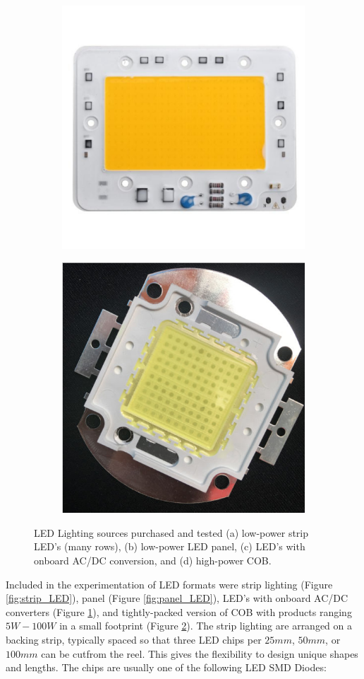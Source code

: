 \documentclass[fleqn,twoside]{article}
\begin{document}
\begin{figure}[h]
	\begin{subfigure}{.5\textwidth}
		\centering
		\includegraphics[width=.7\linewidth]{ac_LED.jpg}
		\caption{}
		\label{fig:ac_LED}
	\end{subfigure}%
	\begin{subfigure}{.5\textwidth}
		\centering
		\includegraphics[width=0.6\linewidth]{LED_vis.png}
		\caption{}
		\label{fig:LED_vis}
	\end{subfigure}%
	\caption{LED Lighting sources purchased and tested (a) low-power strip LED's (many rows), (b) low-power LED panel, (c) LED's with onboard AC/DC conversion, and (d) high-power COB.}
	\label{}
\end{figure}


Included in the experimentation of LED formats were strip lighting (Figure \ref{fig:strip_LED}), panel (Figure \ref{fig:panel_LED}), LED's with onboard AC/DC converters (Figure \ref{fig:ac_LED}), and tightly-packed version of COB with products ranging $5W-100W$ in a small footprint (Figure \ref{fig:LED_vis}). The strip lighting are arranged on a backing strip, typically spaced so that three LED chips per $25mm$, $50mm$, or $100mm$ can be cutfrom the reel. This gives the flexibility to design unique shapes and lengths. The chips are usually one of the following LED SMD Diodes:
\end{document}
